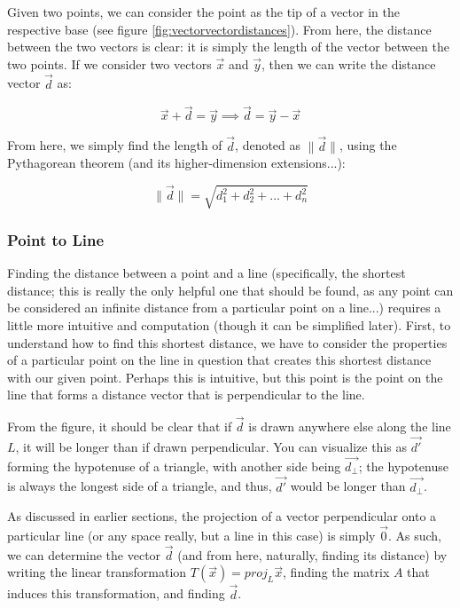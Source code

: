 \documentclass[12pt]{article}
\begin{document}
Given two points, we can consider the point as the tip of a vector in the respective base (see figure \ref{fig:vectorvectordistances}). From here, the distance between the two vectors is clear: it is simply the length of the vector between the two points. If we consider two vectors $\vec{x}$ and $\vec{y}$, then we can write the distance vector $\vec{d}$ as:

$$\vec{x} + \vec{d} = \vec{y} \implies \vec{d} = \vec{y} - \vec{x}$$

From here, we simply find the length of $\vec{d}$, denoted as $\| \vec{d} \| $, using the Pythagorean theorem (and its higher-dimension extensions...):

$$\| \vec{d} \|  = \sqrt{d_1^2 + d_2^2 + ... + d_n^2}$$

\subsubsection{Point to Line}
Finding the distance between a point and a line (specifically, the shortest distance; this is really the only helpful one that should be found, as any point can be considered an infinite distance from a particular point on a line...) requires a little more intuitive and computation (though it can be simplified later). First, to understand how to find this shortest distance, we have to consider the properties of a particular point on the line in question that creates this shortest distance with our given point. Perhaps this is intuitive, but this point is the point on the line that forms a distance vector that is perpendicular to the line. 



From the figure, it should be clear that if $\vec{d}$ is drawn anywhere else along the line $L$, it will be longer than if drawn perpendicular. You can visualize this as $\vec{d'}$ forming the hypotenuse of a triangle, with another side being $\vec{d_{\perp}}$; the hypotenuse is always the longest side of a triangle, and thus, $\vec{d'}$ would be longer than $\vec{d_{\perp}}$. 

As discussed in earlier sections, the projection of a vector perpendicular onto a particular line (or any space really, but a line in this case) is simply $\vec{0}$. As such, we can determine the vector $\vec{d}$ (and from here, naturally, finding its distance) by writing the linear transformation $T(\vec{x}) = proj_{L}\vec{x}$, finding the matrix $A$ that induces this transformation, and finding $\vec{d}$. 
\end{document}
